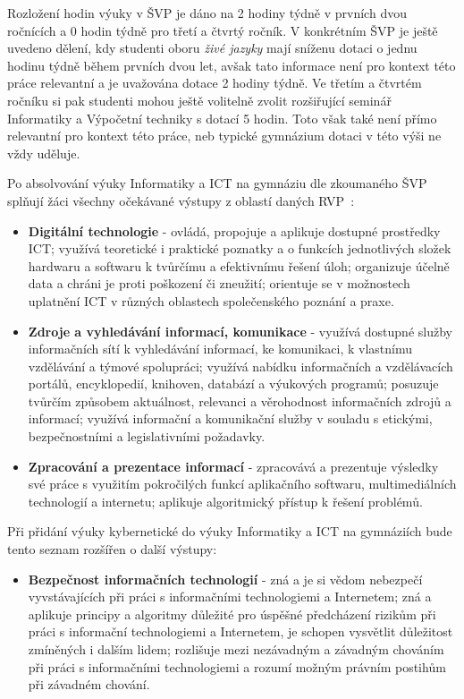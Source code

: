 \documentclass[a4paper, 12pt]{article}
\begin{document}
Rozložení hodin výuky v ŠVP je dáno na 2 hodiny týdně v prvních dvou ročnících a 0 hodin týdně pro třetí a čtvrtý ročník. V konkrétním ŠVP je ještě uvedeno dělení, kdy studenti oboru \textit{živé jazyky} mají sníženu dotaci o jednu hodinu týdně během prvních dvou let, avšak tato informace není pro kontext této práce relevantní a je uvažována dotace 2 hodiny týdně. Ve třetím a čtvrtém ročníku si pak studenti mohou ještě volitelně zvolit rozšiřující seminář Informatiky a Výpočetní techniky s dotací 5 hodin. Toto však také není přímo relevantní pro kontext této práce, neb typické gymnázium dotaci v této výši ne vždy uděluje.

Po absolvování výuky Informatiky a ICT na gymnáziu dle zkoumaného ŠVP splňují žáci všechny očekávané výstupy z oblastí daných RVP~\cite{rvpGym}:
\begin{itemize}
    \setlength{\itemsep}{-3pt}
    \item \textbf{Digitální technologie} - ovládá, propojuje a aplikuje dostupné prostředky ICT; využívá teoretické i praktické poznatky a o funkcích jednotlivých složek hardwaru a softwaru k tvůrčímu a efektivnímu řešení úloh; organizuje účelně data a chráni je proti poškození či zneužití; orientuje se v možnostech uplatnění ICT v různých oblastech společenského poznání a praxe.
    \item \textbf{Zdroje a vyhledávání informací, komunikace} - využívá dostupné služby informačních sítí k vyhledávání informací, ke komunikaci, k vlastnímu vzdělávání a týmové spolupráci; využívá nabídku informačních a vzdělávacích portálů, encyklopedií, knihoven, databází a výukových programů; posuzuje tvůrčím způsobem aktuálnost, relevanci a věrohodnost informačních zdrojů a informací; využívá informační a komunikační služby v souladu s etickými, bezpečnostními a legislativními požadavky.
    \item \textbf{Zpracování a prezentace informací} - zpracovává a prezentuje výsledky své práce s využitím pokročilých funkcí aplikačního softwaru, multimediálních technologií a internetu; aplikuje algoritmický přístup k řešení problémů.
\end{itemize}

Při přidání výuky kybernetické do výuky Informatiky a ICT na gymnáziích bude tento seznam rozšířen o další výstupy:
\begin{itemize}
    \setlength{\itemsep}{-3pt}
    \item \textbf{Bezpečnost informačních technologií} - zná a je si vědom nebezpečí vyvstávajících při práci s informačními technologiemi a Internetem; zná a aplikuje principy a algoritmy důležité pro úspěšné předcházení rizikům při práci s informační technologiemi a Internetem, je schopen vysvětlit důležitost zmíněných i dalším lidem; rozlišuje mezi nezávadným a závadným chováním při práci s informačními technologiemi a rozumí možným právním postihům při závadném chování.
\end{itemize}
\end{document}
